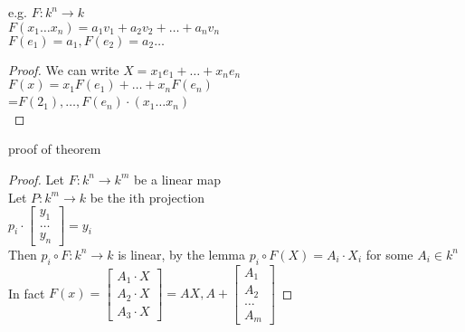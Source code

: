 \documentclass{article}
\newcommand\m[1]{\begin{bmatrix}#1\end{bmatrix}}
\newcommand{\cd}{\cdot}
\newcommand{\lincom}{a_1v_1+a_2v_2+\dots+a_nv_n}
\begin{document}
e.g. $F: k^n\to k$\\
$F(x_1\dots x_n)=\lincom$
\\$F(e_1)=a_1,F(e_2)=a_2\dots $
\begin{proof}
    We can write $X=x_1e_1 +\dots + x_ne_n$\\$F(x)=x_1F(e_1)+\dots +x_nF(e_n)$\\
    =$F(2_1),\dots, F(e_n)\cd (x_1\dots x_n)$
    \\ 
    
\end{proof}
\big proof of theorem
\\
\begin{proof}
    Let $F:k^n \to k^m$ be a linear map\\
    Let $P: k^m \to k$ be the ith projection\\
    $p_i\cd \m{y_1\\\dots\\y_n}=y_i$\\
    Then $p_i \circ F: k^n \to k$ is linear, by the lemma $p_i \circ F(X)=A_i\cd X_i$  for some $A_i \in k^n$\\
    In fact $F(x)=\m{A_1\cd X \\A_2\cd X\\A_3 \cd X}=AX, A+\m{A_1\\A_2\\\dots \\ A_m}$
\end{proof}
\end{document}
